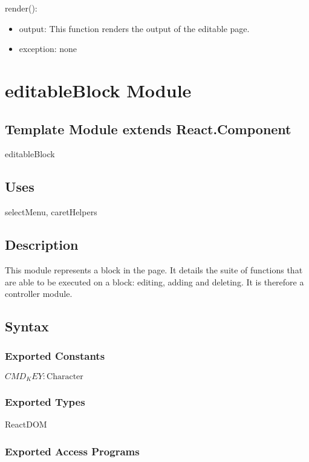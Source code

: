 \documentclass[12pt, titlepage]{article}
\begin{document}
\noindent render():
\begin{itemize}
\item output: This function renders the output of the editable page.
\item exception: none
\end{itemize}

\newpage

\section{editableBlock Module}

\subsection{Template Module extends React.Component}

editableBlock

\subsection{Uses}

selectMenu, caretHelpers

\subsection{Description}
This module represents a block in the page. It details the suite of functions that are able to be executed on a block: editing, adding and deleting. It is therefore a controller module.

\subsection{Syntax}

\subsubsection{Exported Constants}

$\mathit{CMD_KEY}: \text{Character}$

\subsubsection{Exported Types}

ReactDOM

\subsubsection{Exported Access Programs}
\end{document}
